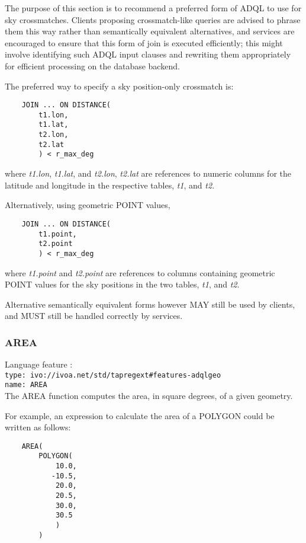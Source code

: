 \documentclass[11pt,a4paper]{ivoa}
\begin{document}
The purpose of this section is to recommend a preferred form of ADQL
to use for sky crossmatches.  Clients proposing crossmatch-like
queries are advised to phrase them this way rather than semantically
equivalent alternatives, and services are encouraged to ensure that
this form of join is executed efficiently; this might involve
identifying such ADQL input clauses and rewriting them appropriately
for efficient processing on the database backend.

The preferred way to specify a sky position-only crossmatch is:
\begin{verbatim}
    JOIN ... ON DISTANCE(
        t1.lon,
        t1.lat,
        t2.lon,
        t2.lat
        ) < r_max_deg
\end{verbatim}
where \textit{t1.lon}, \textit{t1.lat}, and \textit{t2.lon}, \textit{t2.lat}
are references to numeric columns for the latitude and longitude
in the respective tables, \textit{t1}, and \textit{t2}.

Alternatively, using geometric POINT values,
\begin{verbatim}
    JOIN ... ON DISTANCE(
        t1.point,
        t2.point
        ) < r_max_deg
\end{verbatim}
where \textit{t1.point} and \textit{t2.point}
are references to columns containing geometric POINT values
for the sky positions in the two tables, \textit{t1}, and \textit{t2}.

Alternative semantically equivalent forms however MAY still be
used by clients, and MUST still be handled correctly by services.

\subsubsection{AREA}
\label{sec:functions.geom.area}
{\footnotesize Language feature :}\\
{\footnotesize \verb|type: ivo://ivoa.net/std/tapregext#features-adqlgeo|}\\
{\footnotesize \verb|name: AREA|}\\

The AREA function computes the area, in square degrees, of a given geometry.

For example, an expression to calculate the area of a POLYGON could be
written as follows:
\begin{verbatim}
    AREA(
        POLYGON(
            10.0,
           -10.5,
            20.0,
            20.5,
            30.0,
            30.5
            )
        )
\end{verbatim}
\end{document}
